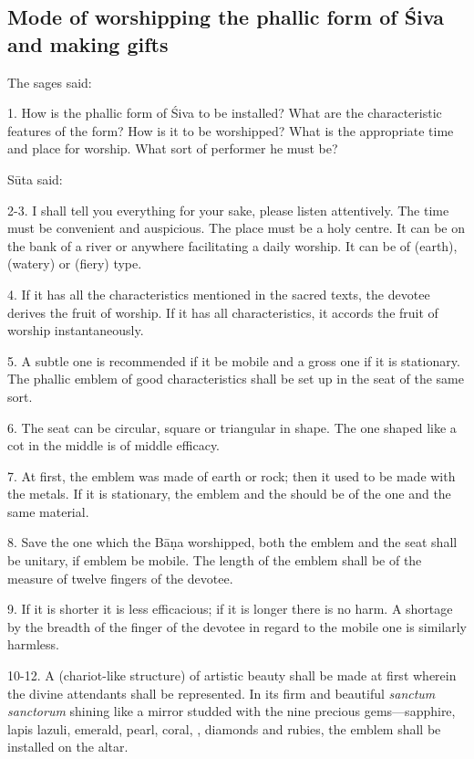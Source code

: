 \subsection{Mode of worshipping the phallic form of Śiva and making gifts}

The sages said:

1. How is the phallic form of Śiva to be installed? What are the characteristic
features of the form? How is it to be worshipped? What is the appropriate time
and place for worship. What sort of performer he must be?

Sūta said:

2-3. I shall tell you everything for your sake, please listen attentively.
The time must be convenient and auspicious. The place must be a holy centre. It
can be on the bank of a river or anywhere facilitating a daily worship. It can
be of  (earth),  (watery) or  (fiery) type.

4. If it has all the characteristics mentioned in the sacred texts, the devotee
derives the fruit of worship. If it has all characteristics, it accords
the fruit of worship instantaneously.

5. A subtle one is recommended if it be mobile and a gross one if it is
stationary. The phallic emblem of good characteristics shall be set up in
the seat of the same sort.

6. The seat can be circular, square or triangular in shape. The one shaped like
a cot in the middle is of middle efficacy.

7. At first, the emblem was made of earth or rock; then it used to be made with
the metals. If it is stationary, the emblem and the  should be of
the one and the same material.

8. Save the one which the  Bāṇa worshipped, both the emblem and
the seat shall be unitary, if emblem be mobile. The length of the emblem shall
be of the measure of twelve fingers of the devotee.

9. If it is shorter it is less efficacious; if it is longer there is no harm.
A shortage by the breadth of the finger of the devotee in regard to the mobile
one is similarly harmless.

10-12. A  (chariot-like structure) of artistic beauty shall be made
at first wherein the divine attendants shall be represented. In its firm and
beautiful \emph{sanctum sanctorum} shining like a mirror studded with the nine
precious gems—sapphire, lapis lazuli, emerald, pearl, coral, ,
diamonds and rubies, the emblem shall be installed on the altar.

